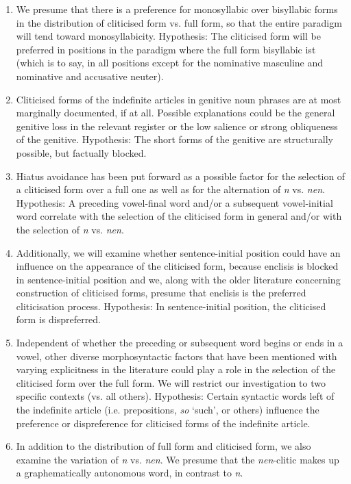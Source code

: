 \begin{enumerate}
	\item We presume that there is a preference for monosyllabic over bisyllabic forms in the distribution of cliticised form vs. full form, so that the entire paradigm will tend toward monosyllabicity.
	Hypothesis: The cliticised form will be preferred in positions in the paradigm where the full form bisyllabic ist (which is to say, in all positions except for the nominative masculine and nominative and accusative neuter).
	\item Cliticised forms of the indefinite articles in genitive noun phrases are at most marginally documented, if at all.
	Possible explanations could be the general genitive loss in the relevant register or the low salience or strong obliqueness of the genitive.
	Hypothesis: The short forms of the genitive are structurally possible, but factually blocked.
	\item Hiatus avoidance has been put forward as a possible factor for the selection of a cliticised form over a full one as well as for the alternation of \textit{n} vs. \textit{nen}.
	Hypothesis: A preceding vowel-final word and/or a subsequent vowel-initial word correlate with the selection of the cliticised form in general and/or with the selection of \textit{n} vs. \textit{nen}.
	\item Additionally, we will examine whether sentence-initial position could have an influence on the appearance of the cliticised form, because enclisis is blocked in sentence-initial position and we, along with the older literature concerning construction of cliticised forms, presume that enclisis is the preferred cliticisation process.
	Hypothesis: In sentence-initial position, the cliticised form is dispreferred.
	\item Independent of whether the preceding or subsequent word begins or ends in a vowel, other diverse morphosyntactic factors that have been mentioned with varying explicitness in the literature could play a role in the selection of the cliticised form over the full form.
	We will restrict our investigation to two specific contexts (vs. all others).
	Hypothesis: Certain syntactic words left of the indefinite article (i.e. prepositions, \textit{so} `such', or others) influence the preference or dispreference for cliticised forms of the indefinite article.
	\item In addition to the distribution of full form and cliticised form, we also examine the variation of \textit{n} vs. \textit{nen}.
	We presume that the \textit{nen}-clitic makes up a graphematically autonomous word, in contrast to \textit{n}.

\end{enumerate}
